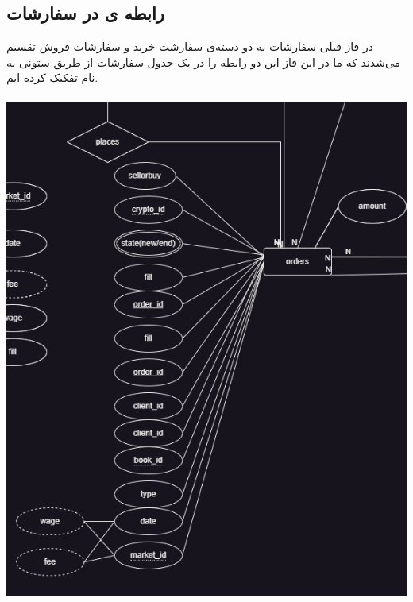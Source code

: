 \documentclass{book}
\begin{document}
\subsection{رابطه ی  در سفارشات}
در فاز قبلی سفارشات به دو دسته‌ی سفارشت خرید و سفارشات فروش تقسیم می‌شدند که ما در این فاز این دو رابطه را در یک جدول سفارشات از طریق ستونی به نام  تفکیک کرده ایم.
\\ \\
\includegraphics[width=0.8\linewidth]{orders.png}
\newpage
\end{document}
